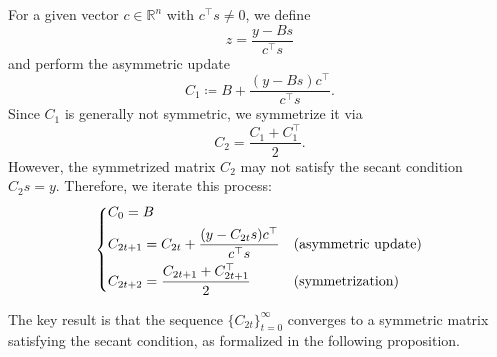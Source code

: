 \documentclass[0_en]{subfiles}
\begin{document}
For a given vector $c \in \mathbb{R}^n$ with $c^\top s \neq 0$, we define
\begin{equation}\label{eq:z-definition}
    z = \frac{y - B s}{c^\top s}
\end{equation}
and perform the asymmetric update
\begin{equation}\label{eq:asymmetric-update}
    C_1 \coloneqq B + \frac{(y - B s)c^\top}{c^\top s}.
\end{equation}
Since $C_1$ is generally not symmetric, we symmetrize it via
\begin{equation}\label{eq:symmetrization}
    C_2 = \frac{C_1 + C_1^\top}{2}.
\end{equation}
However, the symmetrized matrix $C_2$ may not satisfy the secant condition $C_2 s = y$. Therefore, we iterate this process:
\begin{equation}\label{eq:psb-iteration}
    \begin{dcases}
        C_0 = B                                                                               \\
        C_{2t+1} = C_{2t} + \frac{(y - C_{2t}s)c^\top}{c^\top s} & \text{(asymmetric update)} \\
        C_{2t+2} = \frac{C_{2t+1} + C_{2t+1}^\top}{2}            & \text{(symmetrization)}
    \end{dcases}
\end{equation}

The key result is that the sequence $\{ C_{2t} \}_{t=0}^{\infty}$ converges to a symmetric matrix satisfying the secant condition, as formalized in the following proposition.
\end{document}
